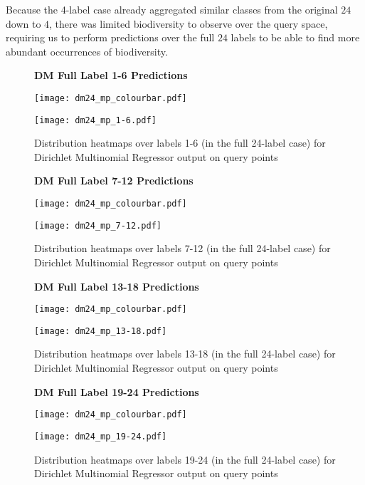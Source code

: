 Because the 4-label case already aggregated similar classes from the original $24$ down to $4$, there was limited biodiversity to observe over the query space, requiring us to perform predictions over the full $24$ labels to be able to find more abundant occurrences of biodiversity.

\begin{figure}[H]
    \textbf{DM Full Label 1-6 Predictions}
    \centerline{\texttt{[image: dm24\_mp\_colourbar.pdf]}}
    \centerline{\texttt{[image: dm24\_mp\_1-6.pdf]}}
    \caption{Distribution heatmaps over labels 1-6 (in the full 24-label case) for Dirichlet Multinomial Regressor output on query points}
    \label{fig:dm_24-1_label_heatmap}
    \hfill
\end{figure}

\begin{figure}[H]
    \textbf{DM Full Label 7-12 Predictions}
    \centerline{\texttt{[image: dm24\_mp\_colourbar.pdf]}}
    \centerline{\texttt{[image: dm24\_mp\_7-12.pdf]}}
    \caption{Distribution heatmaps over labels 7-12 (in the full 24-label case) for Dirichlet Multinomial Regressor output on query points}
    \label{fig:dm_24-2_label_heatmap}
    \hfill
\end{figure}

\begin{figure}[H]
    \textbf{DM Full Label 13-18 Predictions}
    \centerline{\texttt{[image: dm24\_mp\_colourbar.pdf]}}
    \centerline{\texttt{[image: dm24\_mp\_13-18.pdf]}}
    \caption{Distribution heatmaps over labels 13-18 (in the full 24-label case) for Dirichlet Multinomial Regressor output on query points}
    \label{fig:dm_24-3_label_heatmap}
    \hfill
\end{figure}

\begin{figure}[H]
    \textbf{DM Full Label 19-24 Predictions}
    \centerline{\texttt{[image: dm24\_mp\_colourbar.pdf]}}
    \centerline{\texttt{[image: dm24\_mp\_19-24.pdf]}}
    \caption{Distribution heatmaps over labels 19-24 (in the full 24-label case) for Dirichlet Multinomial Regressor output on query points}
    \label{fig:dm_24-4_label_heatmap}
    \hfill
\end{figure}


